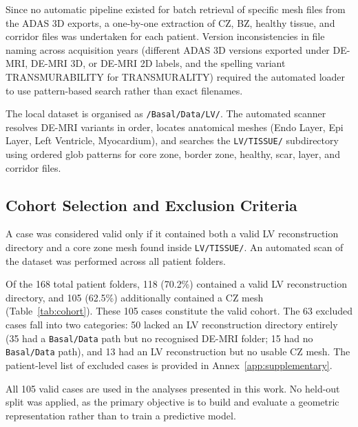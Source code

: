 Since no automatic pipeline existed for batch retrieval of specific mesh files from the ADAS
3D exports, a one-by-one extraction of CZ, BZ, healthy tissue, and corridor files was
undertaken for each patient. Version inconsistencies in file naming across acquisition years
(different ADAS 3D versions exported under DE-MRI, DE-MRI 3D, or DE-MRI 2D labels, and
the spelling variant TRANSMURABILITY for TRANSMURALITY) required the automated
loader to use pattern-based search rather than exact filenames.

The local dataset is organised as \texttt{/Basal/Data/LV/}. The automated scanner resolves
DE-MRI variants in order, locates anatomical meshes (Endo Layer, Epi Layer, Left
Ventricle, Myocardium), and searches the \texttt{LV/TISSUE/} subdirectory using ordered
glob patterns for core zone, border zone, healthy, scar, layer, and corridor files.

\subsection{Cohort Selection and Exclusion Criteria}

A case was considered valid only if it contained both a valid LV reconstruction directory and
a core zone mesh found inside \texttt{LV/TISSUE/}. An automated scan of the dataset was
performed across all patient folders.

Of the 168 total patient folders, 118 (70.2\%) contained a valid LV reconstruction directory,
and 105 (62.5\%) additionally contained a CZ mesh (Table~\ref{tab:cohort}). These 105
cases constitute the valid cohort. The 63 excluded cases fall into two categories: 50 lacked
an LV reconstruction directory entirely (35 had a \texttt{Basal/Data} path but no recognised
DE-MRI folder; 15 had no \texttt{Basal/Data} path), and 13 had an LV reconstruction but no
usable CZ mesh. The patient-level list of excluded cases is provided in Annex~\ref{app:supplementary}.

All 105 valid cases are used in the analyses presented in this work. No held-out split was
applied, as the primary objective is to build and evaluate a geometric representation rather
than to train a predictive model.

